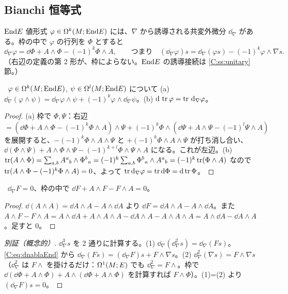 \subsection{Bianchi 恒等式}
\label{C:ss:bianchi}
$\mathrm{End} E$ 値形式 $\varphi\in\Omega^k(M;\mathrm{End} E)$ には、$\nabla$ から誘導される共変外微分 $\dd_\nabla$ がある。枠の中で $\varphi$ の行列を $\Phi$ とすると
\begin{equation}\label{C:eq:dnablaEnd}
\dd_\nabla\varphi=\dd\Phi+A\wedge\Phi-(-1)^k\Phi\wedge A,\qquad\text{つまり}\quad(\dd_\nabla\varphi)s=\dd_\nabla(\varphi s)-(-1)^k\varphi\wedge\nabla s .
\end{equation}
（右辺の定義の第 2 形が、枠によらない。$\mathrm{End} E$ の誘導接続は \ref{C:ss:unitary} 節。）
\begin{lem}\label{C:lem:leib}\tP\
$\varphi\in\Omega^k(M;\mathrm{End} E)$, $\psi\in\Omega^l(M;\mathrm{End} E)$ について (a) $\dd_\nabla(\varphi\wedge\psi)=\dd_\nabla\varphi\wedge\psi+(-1)^k\varphi\wedge\dd_\nabla\psi$。(b) $\mathrm{d}\,\operatorname{tr}\varphi=\operatorname{tr}\,\mathrm{d}_\nabla\varphi$。
\end{lem}
\begin{proof}
(a) 枠で $\Phi,\Psi$：右辺 $=(\dd\Phi+A\wedge\Phi-(-1)^k\Phi\wedge A)\wedge\Psi+(-1)^k\Phi\wedge(\dd\Psi+A\wedge\Psi-(-1)^l\Psi\wedge A)$ を展開すると、$-(-1)^k\Phi\wedge A\wedge\Psi$ と $+(-1)^k\Phi\wedge A\wedge\Psi$ が打ち消し合い、$\dd(\Phi\wedge\Psi)+A\wedge\Phi\wedge\Psi-(-1)^{k+l}\Phi\wedge\Psi\wedge A$ になる。これが左辺。(b) $\operatorname{tr}(A\wedge\Phi)=\sum_{a,b}A^a{}_b\wedge\Phi^b{}_a=(-1)^{k}\sum_{a,b}\Phi^b{}_a\wedge A^a{}_b=(-1)^k\operatorname{tr}(\Phi\wedge A)$ なので $\operatorname{tr}(A\wedge\Phi-(-1)^k\Phi\wedge A)=0$、よって $\operatorname{tr}\mathrm{d}_\nabla\varphi=\operatorname{tr}\mathrm{d}\Phi=\mathrm{d}\operatorname{tr}\Phi$。
\end{proof}
\begin{thm}[Bianchi 恒等式]\label{C:thm:bianchi}\tP\
$\dd_\nabla F=0$、枠の中で $\dd F+A\wedge F-F\wedge A=0$。
\end{thm}
\begin{proof}
$\dd(A\wedge A)=\dd A\wedge A-A\wedge\dd A$ より $\dd F=\dd A\wedge A-A\wedge\dd A$。また $A\wedge F-F\wedge A=A\wedge\dd A+A\wedge A\wedge A-\dd A\wedge A-A\wedge A\wedge A=A\wedge\dd A-\dd A\wedge A$。足すと $0$。
\end{proof}
\begin{proof}[別証（概念的）]
$\dd_\nabla^3s$ を 2 通りに計算する。(1) $\dd_\nabla(\dd_\nabla^2s)=\dd_\nabla(Fs)$。\eqref{C:eq:dnablaEnd} から $\dd_\nabla(Fs)=(\dd_\nabla F)s+F\wedge\nabla s$。(2) $\dd_\nabla^2(\nabla s)=F\wedge\nabla s$（$\dd_\nabla^2$ は $F\wedge$ を掛けるだけ：$\Omega^1(M;E)$ でも $\dd_\nabla^2=F\wedge$。枠で $\dd(\dd\Phi+A\wedge\Phi)+A\wedge(\dd\Phi+A\wedge\Phi)$ を計算すれば $F\wedge\Phi$）。(1)=(2) より $(\dd_\nabla F)s=0$。
\end{proof}


